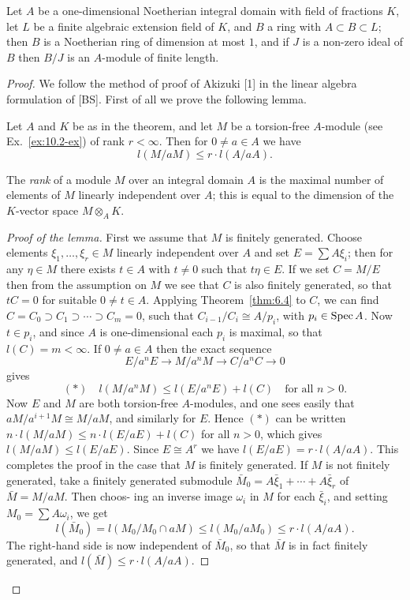 \begin{theorem}\label{thm:11.7}
Let $A$ be a one-dimensional
Noetherian integral domain with field of fractions $K$, let $L$ be a finite
algebraic extension field of $K$, and $B$ a ring with $A \subset B \subset L$; then $B$ is a
Noetherian ring of dimension at most $1$, and if $J$ is a non-zero ideal of $B$ then
$B/J$ is an $A$-module of finite length.
\end{theorem}

\begin{proof}
We follow the method of proof of Akizuki [1] in the linear algebra
formulation of [BS]. First of all we prove the following lemma.

\begin{lemma}\label{lem:11.1}
Let $A$ and $K$ be as in the theorem, and let $M$ be a torsion-free
$A$-module (see Ex.~\ref{ex:10.2-ex}) of rank $r < \infty$. Then for $0 \neq a \in A$ we have
\[
  l(M/aM) \le r \cdot l(A/aA).
\]
\end{lemma}

\begin{remark}
The \emph{rank} of a module $M$ over an integral domain $A$ is the maximal
number of elements of $M$ linearly independent over $A$; this is equal to the
dimension of the $K$-vector space $M \otimes_A K$.
\end{remark}

\begin{proof}[Proof of the lemma]
First we assume that $M$ is finitely generated. Choose
elements $\xi_1, \ldots, \xi_r \in M$ linearly independent over $A$ and set $E = \sum A\xi_i$; then
for any $\eta \in M$ there exists $t \in A$ with $t \neq 0$ such that $t\eta \in E$. If we set $C = M/E$
then from the assumption on $M$ we see that $C$ is also finitely generated, so
that $tC = 0$ for suitable $0 \neq t \in A$. Applying Theorem~\ref{thm:6.4} to $C$, we can find
$C = C_0 \supset C_1 \supset \cdots \supset C_m = 0$, such that $C_{i-1}/C_i \cong A/p_i$, with $p_i \in \operatorname{Spec} A$.
Now $t \in p_i$, and since $A$ is one-dimensional each $p_i$ is maximal, so that
$l(C) = m < \infty$. If $0 \neq a \in A$ then the exact sequence
\[
  E/a^nE \to M/a^nM \to C/a^nC \to 0
\]
gives
\[
  (*) \quad l(M/a^nM) \le l(E/a^nE) + l(C) \quad \text{for all } n > 0.
\]
Now $E$ and $M$ are both torsion-free $A$-modules, and one sees easily that
$aM/a^{i+1}M \cong M/aM$, and similarly for $E$. Hence $(*)$ can be written
$n \cdot l(M/aM) \le n \cdot l(E/aE) + l(C)$ for all $n > 0$, which gives $l(M/aM) \le l(E/aE)$.
Since $E \cong A^r$ we have $l(E/aE) = r \cdot l(A/aA)$. This completes the proof in the
case that $M$ is finitely generated. If $M$ is not finitely generated, take a finitely
generated submodule $\bar{M}_0 = A\bar{\xi}_1 + \cdots + A\bar{\xi}_r$ of $\bar{M} = M/aM$. Then choos-
ing an inverse image $\omega_i$ in $M$ for each $\bar{\xi}_i$, and setting $M_0 = \sum A\omega_i$, we get
\[
  l(\bar{M}_0) = l(M_0/M_0 \cap aM) \le l(M_0/aM_0) \le r \cdot l(A/aA).
\]
The right-hand side is now independent of $\bar{M}_0$, so that $\bar{M}$ is in fact finitely
generated, and $l(\bar{M}) \le r \cdot l(A/aA)$.
\end{proof}


\end{proof}
